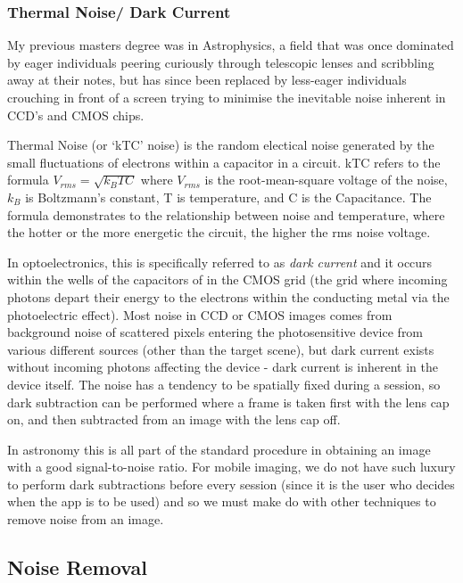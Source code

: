 {{\subsubsection{Thermal Noise/ Dark Current}

My previous masters degree was in Astrophysics, a field that was once dominated by eager individuals peering curiously through telescopic lenses and scribbling away at their notes, but has since been replaced by less-eager individuals crouching in front of a screen trying to minimise the inevitable noise inherent in CCD’s and CMOS chips.

Thermal Noise (or ‘kTC’ noise) is the random electical noise generated by the small fluctuations of electrons within a capacitor in a circuit. kTC refers to the formula \(V_{rms}=\sqrt{k_BTC}\) where \(V_{rms}\) is the root-mean-square voltage of the noise, \(k_B\) is Boltzmann’s constant, T is temperature, and C is the Capacitance. The formula demonstrates to the relationship between noise and temperature, where the hotter or the more energetic the circuit, the higher the rms noise voltage.

In optoelectronics, this is specifically referred to as {\it dark current} and it occurs within the wells of the capacitors of in the CMOS grid (the grid where incoming photons depart their energy to the electrons within the conducting metal via the photoelectric effect). Most noise in CCD or CMOS images comes from background noise of scattered pixels entering the photosensitive device from various different sources (other than the target scene), but dark current exists without incoming photons affecting the device - dark current is inherent in the device itself.  The noise has a tendency to be spatially fixed during a session, so dark subtraction can be performed where a frame is taken first with the lens cap on, and then subtracted from an image with the lens cap off. 

In astronomy this is all part of the standard procedure in obtaining an image with a good signal-to-noise ratio. For mobile imaging, we do not have such luxury to perform dark subtractions before every session (since it is the user who decides when the app is to be used) and so we must make do with other techniques to remove noise from an image.

\subsection {Noise Removal}
}}
